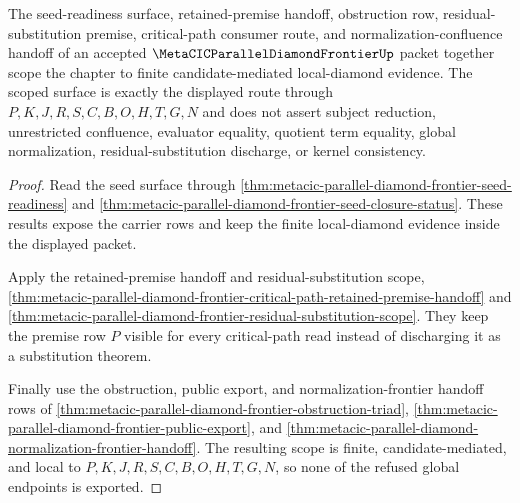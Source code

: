 \begin{theorem}
\label{thm:metacic-parallel-diamond-frontier-scoped-closure-status}
The seed-readiness surface, retained-premise handoff, obstruction row, residual-substitution premise, critical-path consumer route, and normalization-confluence handoff of an accepted $\MetaCICParallelDiamondFrontierUp$ packet together scope the chapter to finite candidate-mediated local-diamond evidence. The scoped surface is exactly the displayed route through $P,K,J,R,S,C,B,O,H,T,G,N$ and does not assert subject reduction, unrestricted confluence, evaluator equality, quotient term equality, global normalization, residual-substitution discharge, or kernel consistency.
\end{theorem}
\begin{proof}
Read the seed surface through \autoref{thm:metacic-parallel-diamond-frontier-seed-readiness} and \autoref{thm:metacic-parallel-diamond-frontier-seed-closure-status}. These results expose the carrier rows and keep the finite local-diamond evidence inside the displayed packet.

Apply the retained-premise handoff and residual-substitution scope, \autoref{thm:metacic-parallel-diamond-frontier-critical-path-retained-premise-handoff} and \autoref{thm:metacic-parallel-diamond-frontier-residual-substitution-scope}. They keep the premise row $P$ visible for every critical-path read instead of discharging it as a substitution theorem.

Finally use the obstruction, public export, and normalization-frontier handoff rows of \autoref{thm:metacic-parallel-diamond-frontier-obstruction-triad}, \autoref{thm:metacic-parallel-diamond-frontier-public-export}, and \autoref{thm:metacic-parallel-diamond-normalization-frontier-handoff}. The resulting scope is finite, candidate-mediated, and local to $P,K,J,R,S,C,B,O,H,T,G,N$, so none of the refused global endpoints is exported.
\end{proof}

